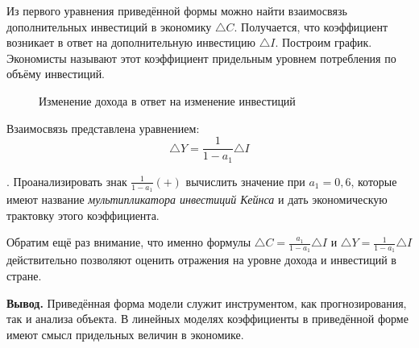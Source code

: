 \documentclass[12pt,a4paper]{article}
\begin{document}
Из первого уравнения приведённой формы можно найти взаимосвязь дополнительных инвестиций в экономику $\triangle C$. Получается, что коэффициент возникает в ответ на дополнительную инвестицию $\triangle I$. Построим график. Экономисты называют этот коэффициент придельным уровнем потребления по объёму инвестиций.

\begin{figure}[H]
\begin{center}
\caption{Изменение дохода в ответ на изменение инвестиций}
\end{center}
\end{figure}

Взаимосвязь представлена уравнением:
\begin{equation}
\triangle Y = \displaystyle{\frac{1}{1-a_1} \triangle I}
\end{equation}

. Проанализировать знак $\displaystyle{\frac{1}{1-a_1}} (+)$ вычислить значение при $a_1 = 0,6$, которые имеют название \textit{мультипликатора инвестиций Кейнса} и дать экономическую трактовку этого коэффициента. 

Обратим ещё раз внимание, что именно формулы $\triangle C = \displaystyle{\frac{a_1}{1-a_1} \triangle I}$ и $\triangle Y = \displaystyle{\frac{1}{1-a_1} \triangle I}$ действительно позволяют оценить отражения на уровне дохода и инвестиций в стране.

\textbf{Вывод.} Приведённая форма модели служит инструментом, как прогнозирования, так и анализа объекта. В линейных моделях коэффициенты в приведённой форме имеют смысл придельных величин в экономике.
\end{document}

